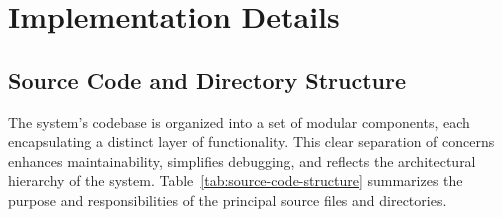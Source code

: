 \section{Implementation Details}

\subsection{Source Code and Directory Structure}

The system’s codebase is organized into a set of modular components, each encapsulating a distinct layer of functionality. 
This clear separation of concerns enhances maintainability, simplifies debugging, and reflects the architectural hierarchy of the system. 
Table~\ref{tab:source-code-structure} summarizes the purpose and responsibilities of the principal source files and directories.
